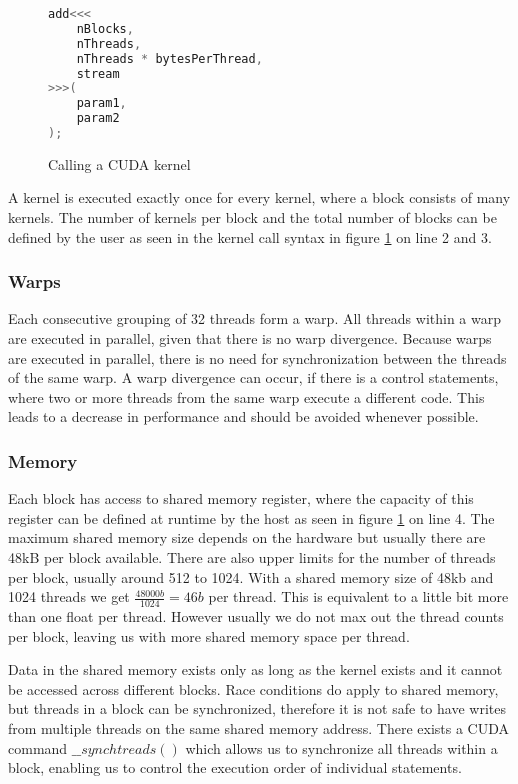 \documentclass[]{article}
\begin{document}
\begin{figure}[H]
	\begin{lstlisting}[language=c++]
add<<<
	nBlocks,
	nThreads,
	nThreads * bytesPerThread,
	stream
>>>(
	param1,
	param2
);
	\end{lstlisting}
\caption{Calling a CUDA kernel}
\label{cuda:call}
\end{figure}

A kernel is executed exactly once for every kernel, where a block consists of many kernels. The number of kernels per block and the total number of blocks can be defined by the user as seen in the kernel call syntax in figure \ref{cuda:call} on line 2 and 3. 


\subsubsection{Warps}

Each consecutive grouping of 32 threads form a warp. All threads within a warp are executed in parallel, given that there is no warp divergence. Because warps are executed in parallel, there is no need for synchronization between the threads of the same warp. A warp divergence can occur, if there is a control statements, where two or more threads from the same warp execute a different code. This leads to a decrease in performance and should be avoided whenever possible.

\subsubsection{Memory}

Each block has access to shared memory register, where the capacity of this register can be defined at runtime by the host as seen in figure \ref{cuda:call} on line 4. The maximum shared memory size depends on the hardware but usually there are 48kB per block available. There are also upper limits for the number of threads per block, usually  around 512 to 1024. With a shared memory size of 48kb and 1024 threads we get $\frac{48000b}{1024} = 46b$ per thread. This is equivalent to a little bit more than one float per thread. However usually we do not max out the thread counts per block, leaving us with more shared memory space per thread. 

Data in the shared memory exists only as long as the kernel exists and it cannot be accessed across different blocks. Race conditions do apply to shared memory, but threads in a block can be synchronized, therefore it is not safe to have writes from multiple threads on the same shared memory address. There exists a CUDA command $\_\_synchtreads()$ which allows us to synchronize all threads within a block, enabling us to control the execution order of individual statements.
\end{document}
